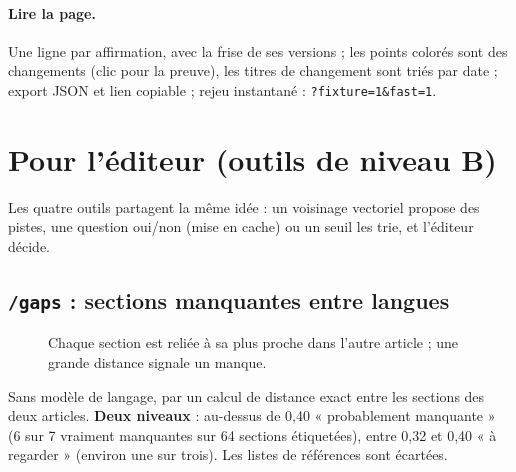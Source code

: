 \documentclass[11pt,a4paper]{article}
\begin{document}
\paragraph{Lire la page.} Une ligne par affirmation, avec la frise de ses versions ; les points colorés sont des changements (clic pour la preuve), les titres de changement sont triés par date ; export JSON et lien copiable ; rejeu instantané : \texttt{?fixture=1\&fast=1}.

\section{Pour l'éditeur (outils de niveau B)}
Les quatre outils partagent la même idée : un voisinage vectoriel propose des pistes, une question oui/non (mise en cache) ou un seuil les trie, et l'éditeur décide.

\subsection{\texttt{/gaps} : sections manquantes entre langues}
\begin{figure}[H]\centering
{}
\caption{Chaque section est reliée à sa plus proche dans l'autre article ; une grande distance signale un manque.}
\end{figure}
Sans modèle de langage, par un calcul de distance exact entre les sections des deux articles. \textbf{Deux niveaux} : au-dessus de 0,40 « probablement manquante » (6 sur 7 vraiment manquantes sur 64 sections étiquetées), entre 0,32 et 0,40 « à regarder » (environ une sur trois). Les listes de références sont écartées.
\end{document}
